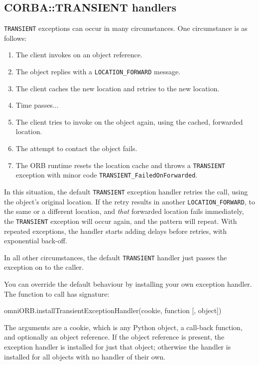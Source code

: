\documentclass[draft,11pt,twoside,a4paper]{book}
\newcommand{\code}[1]{\texttt{#1}}
\begin{document}
\subsection{CORBA::TRANSIENT handlers}

\code{TRANSIENT} exceptions can occur in many circumstances. One
circumstance is as follows:

\begin{enumerate}

\item The client invokes on an object reference.
\item The object replies with a \code{LOCATION\_FORWARD} message.
\item The client caches the new location and retries to the new location.
\item Time passes...
\item The client tries to invoke on the object again, using the
      cached, forwarded location. 
\item The attempt to contact the object fails.
\item The ORB runtime resets the location cache and throws a
      \code{TRANSIENT} exception with minor code
      \code{TRANSIENT\_FailedOnForwarded}.

\end{enumerate}

In this situation, the default \code{TRANSIENT} exception handler
retries the call, using the object's original location. If the retry
results in another \code{LOCATION\_FORWARD}, to the same or a
different location, and \emph{that} forwarded location fails
immediately, the \code{TRANSIENT} exception will occur again, and the
pattern will repeat. With repeated exceptions, the handler starts
adding delays before retries, with exponential back-off.

In all other circumstances, the default \code{TRANSIENT} handler just
passes the exception on to the caller.

You can override the default behaviour by installing your own
exception handler. The function to call has signature:

\begin{pylisting}
omniORB.installTransientExceptionHandler(cookie, function [, object])
\end{pylisting}

The arguments are a cookie, which is any Python object, a call-back
function, and optionally an object reference. If the object reference
is present, the exception handler is installed for just that object;
otherwise the handler is installed for all objects with no handler of
their own.
\end{document}
